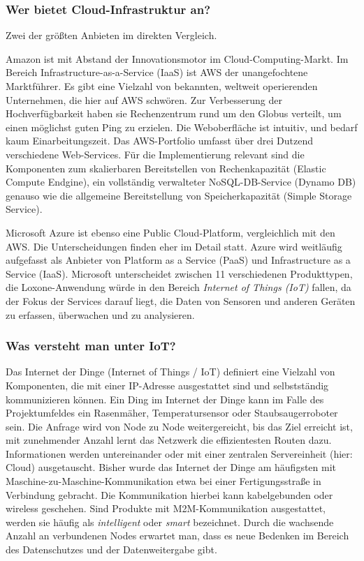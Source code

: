 \documentclass[letterpaper, 12pt]{article}
\let\tempsubsubsection\subsubsection
\renewcommand\subsubsection[1]{\vspace{0cm}\tempsubsubsection{#1}\vspace{0cm}}
\begin{document}
\clearpage

\subsubsection{Wer bietet Cloud-Infrastruktur an?}

Zwei der größten Anbieten im direkten Vergleich.


Amazon ist mit Abstand der Innovationsmotor im Cloud-Computing-Markt. Im Bereich Infrastructure-as-a-Service (IaaS) ist AWS der unangefochtene Marktführer. Es gibt eine Vielzahl von bekannten, weltweit operierenden Unternehmen, die hier auf AWS schwören. Zur Verbesserung der Hochverfügbarkeit haben sie Rechenzentrum rund um den Globus verteilt, um einen möglichst guten Ping zu erzielen. Die Weboberfläche ist intuitiv, und bedarf kaum Einarbeitungszeit. Das AWS-Portfolio umfasst über drei Dutzend verschiedene Web-Services. Für die Implementierung relevant sind die Komponenten zum skalierbaren Bereitstellen von Rechenkapazität (Elastic Compute Endgine), ein vollständig verwalteter NoSQL-DB-Service (Dynamo DB) genauso wie die allgemeine Bereitstellung von Speicherkapazität (Simple Storage Service).


Microsoft Azure ist ebenso eine Public Cloud-Platform, vergleichlich mit den AWS. Die Unterscheidungen finden eher im Detail statt. Azure wird weitläufig aufgefasst als Anbieter von Platform as a Service (PaaS) und Infrastructure as a Service (IaaS). Microsoft unterscheidet zwischen 11 verschiedenen Produkttypen, die Loxone-Anwendung würde in den Bereich \textit{Internet of Things (IoT)} fallen, da der Fokus der Services darauf liegt, die Daten von Sensoren und anderen Geräten zu erfassen, überwachen und zu analysieren. \cite{azure}

\subsubsection{Was versteht man unter IoT?}

Das Internet der Dinge (Internet of Things / IoT) definiert eine Vielzahl von Komponenten, die mit einer IP-Adresse ausgestattet sind und selbstständig kommunizieren können. Ein Ding im Internet der Dinge kann im Falle des Projektumfeldes ein Rasenmäher, Temperatursensor oder Staubsaugerroboter sein. Die Anfrage wird von Node zu Node weitergereicht, bis das Ziel erreicht ist, mit zunehmender Anzahl lernt das Netzwerk die effizientesten Routen dazu. Informationen werden untereinander oder mit einer zentralen Servereinheit (hier: Cloud) ausgetauscht. Bisher wurde das Internet der Dinge am häufigsten mit Maschine-zu-Maschine-Kommunikation etwa bei einer Fertigungsstraße in Verbindung gebracht. Die Kommunikation hierbei kann kabelgebunden oder wireless geschehen. Sind Produkte mit M2M-Kommunikation ausgestattet, werden sie häufig als \textit{intelligent} oder \textit{smart} bezeichnet. Durch die wachsende Anzahl an verbundenen Nodes erwartet man, dass es neue Bedenken im Bereich des Datenschutzes und der Datenweitergabe gibt. \cite{iot} \clearpage
\end{document}
